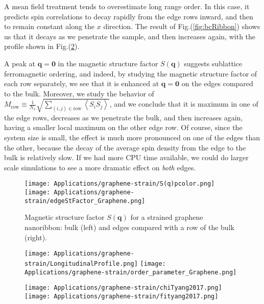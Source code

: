 A mean field treatment tends to overestimate long range order.
In this case, it predicts spin correlations to decay rapidly from the edge rows inward, and then to remain constant along the $x$ direction.
The result of Fig.(\ref{fig:bcRibbon}) shows us that it decays as we penetrate the sample, and then increases again, with the profile shown in Fig.(\ref{fig:longProf}).

A peak at $\bm q = \bm 0$ in the magnetic structure factor $S ( \bm q )$ suggests sublattice ferromagnetic ordering, and indeed, by studying the magnetic structure factor of each row separately, we see that it is enhanced at $\bm q = \bm 0$ on the edges compared to the bulk.
Moreover, we study the behavior of $M_{\text{row}} \equiv \frac{1}{N_x}\sqrt{ \sum_{(i, j) \in \text{row}} \left\langle S_i S_j \right\rangle}$, and we conclude that it is maximum in one of the edge rows, decreases as we penetrate the bulk, and then increases again, having a smaller local maximum on the other edge row.
Of course, since the system size is small, the effect is much more pronounced on one of the edges than the other, because the decay of the average spin density from the edge to the bulk is relatively slow.
If we had more CPU time available, we could do larger scale simulations to see a more dramatic effect on \emph{both} edges.

\begin{figure}[H]
\texttt{[image: Applications/graphene-strain/S(q)pcolor.png]}
\hspace{-0.7cm}
\texttt{[image: Applications/graphene-strain/edgeStFactor\_Graphene.png]}
	\caption[Magnetic structure factor $S(\bm q)$ for a strained graphene nanoribbon: bulk and edges.]{Magnetic structure factor $S(\bm q)$ for a strained graphene nanoribbon: bulk (left) and edges compared with a row of the bulk (right).}
	\label{fig:edgeStFactor}
\end{figure}
\begin{figure}[H]
\texttt{[image: Applications/graphene-strain/LongitudinalProfile.png]}
\texttt{[image: Applications/graphene-strain/order\_parameter\_Graphene.png]}
	\caption[Spin-spin correlation function profile along the ribbon's ]{}
	\label{fig:longProf}
\end{figure}
\begin{figure}[H]
\hspace{-0.2cm}
\texttt{[image: Applications/graphene-strain/chiTyang2017.png]}
\texttt{[image: Applications/graphene-strain/fityang2017.png]}
	\caption[]{}
	\label{fig:chiFit}
\end{figure}

